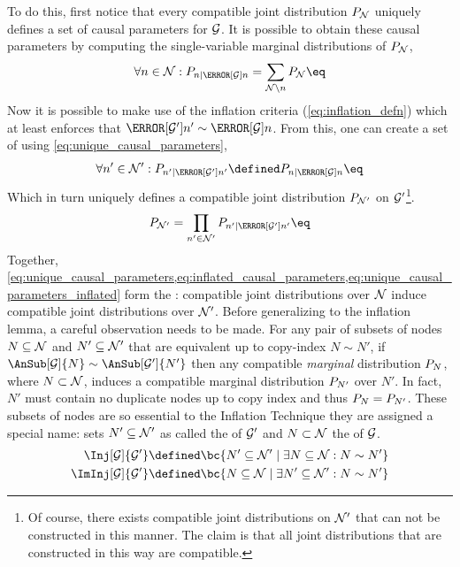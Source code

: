 \documentclass[aps, 10pt, english, twoside, pra, nofootinbib, tightenlines, longbibliography, superscriptaddress]{revtex4-1}
\begin{document}
    To do this, first notice that every compatible joint distribution $\prob[\nodes]$ uniquely defines a set of causal parameters for $\mathcal{G}$. It is possible to obtain these causal parameters by computing the single-variable marginal distributions of $\prob[\nodes]$,
    \[ \forall n \in \nodes : \prob[n\mid \Pa[\graph]{n}] = \sum_{\nodes \setminus n} \prob[\nodes] \eq \label{eq:unique_causal_parameters}\]
    Now it is possible to make use of the inflation criteria (\cref{eq:inflation_defn}) which at least enforces that $\Pa[\graph']{n'} \sim \Pa[\graph]{n}$. From this, one can create a set of  using \cref{eq:unique_causal_parameters},
    \[ \forall n' \in \nodes' : \prob[n'\mid \Pa[\graph']{n'}] \defined \prob[n\mid \Pa[\graph]{n}] \eq \label{eq:inflated_causal_parameters} \]
    Which in turn uniquely defines a compatible joint distribution $\prob[\nodes']$ on $\mathcal{G}'$\footnote{Of course, there exists compatible joint distributions on $\mathcal{N}'$ that can not be constructed in this manner. The claim is that all joint distributions that are constructed in this way are compatible.}.
    \[ \prob[\nodes'] = \prod_{n' \in \nodes'} \prob[n'\mid \Pa[\graph']{n'}] \eq \label{eq:unique_causal_parameters_inflated}\]
    Together, \cref{eq:unique_causal_parameters,eq:inflated_causal_parameters,eq:unique_causal_parameters_inflated} form the : compatible joint distributions over $\mathcal{N}$ induce compatible joint distributions over $\mathcal{N}'$. Before generalizing to the inflation lemma, a careful observation needs to be made. For any pair of subsets of nodes $N \subseteq \mathcal{N}$ and $N' \subseteq \mathcal{N}'$ that are equivalent up to copy-index $N \sim N'$, if $\AnSub[\graph]{N} \sim \AnSub[\graph']{N'}$ then any compatible \textit{marginal} distribution $\prob[N]$, where $N \subset \mathcal{N}$, induces a compatible marginal distribution $\prob[N']$ over $N'$. In fact, $N'$ must contain no duplicate nodes up to copy index and thus $\prob[N] = \prob[N']$. These subsets of nodes are so essential to the Inflation Technique they are assigned a special name: sets $N' \subseteq \mathcal{N}'$ as called the  of $\mathcal{G}'$ and $N \subset \mathcal{N}$ the  of $\mathcal{G}$.
    \begin{align*}
        \Inj[\graph]{\graph'} &\defined \bc{N' \subseteq \nodes' \mid \exists N \subseteq \nodes : N \sim N'} \\
        \ImInj[\graph]{\graph'} &\defined \bc{N \subseteq \nodes \mid \exists N' \subseteq \nodes' : N \sim N'}
    \end{align*}
\end{document}
